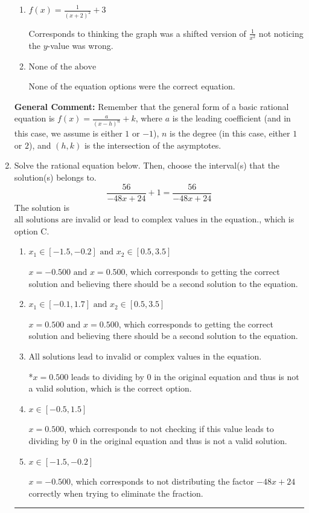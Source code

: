 \documentclass{extbook}[14pt]
\newcommand{\litem}[1]{\item #1

\rule{\textwidth}{0.4pt}}
\begin{document}
\begin{enumerate}
{\begin{enumerate}[label=\Alph*.]
The $x$- and $y$-value of the equation does not match the graph.
\item \( f(x) = \frac{1}{(x + 2)^2} + 3 \)

Corresponds to thinking the graph was a shifted version of $\frac{1}{x^2}$ not noticing the $y$-value was wrong.
\item \( \text{None of the above} \)

None of the equation options were the correct equation.
\end{enumerate}

\textbf{General Comment:} Remember that the general form of a basic rational equation is $ f(x) = \frac{a}{(x-h)^n} + k$, where $a$ is the leading coefficient (and in this case, we assume is either $1$ or $-1$), $n$ is the degree (in this case, either $1$ or $2$), and $(h, k)$ is the intersection of the asymptotes.
}
\litem{
Solve the rational equation below. Then, choose the interval(s) that the solution(s) belongs to.
\[ \frac{56}{-48x + 24} + 1 = \frac{56}{-48x + 24} \]The solution is \( \text{all solutions are invalid or lead to complex values in the equation.} \), which is option C.\begin{enumerate}[label=\Alph*.]
\item \( x_1 \in [-1.5, -0.2] \text{ and } x_2 \in [0.5,3.5] \)

$x = -0.500 \text{ and } x = 0.500$, which corresponds to getting the correct solution and believing there should be a second solution to the equation.
\item \( x_1 \in [-0.1, 1.7] \text{ and } x_2 \in [0.5,3.5] \)

$x = 0.500 \text{ and } x = 0.500$, which corresponds to getting the correct solution and believing there should be a second solution to the equation.
\item \( \text{All solutions lead to invalid or complex values in the equation.} \)

*$x = 0.500$ leads to dividing by 0 in the original equation and thus is not a valid solution, which is the correct option.
\item \( x \in [-0.5,1.5] \)

$x = 0.500$, which corresponds to not checking if this value leads to dividing by 0 in the original equation and thus is not a valid solution.
\item \( x \in [-1.5,-0.2] \)

$x = -0.500$, which corresponds to not distributing the factor $-48x + 24$ correctly when trying to eliminate the fraction.
\end{enumerate}

}
\end{enumerate}
\end{document}
